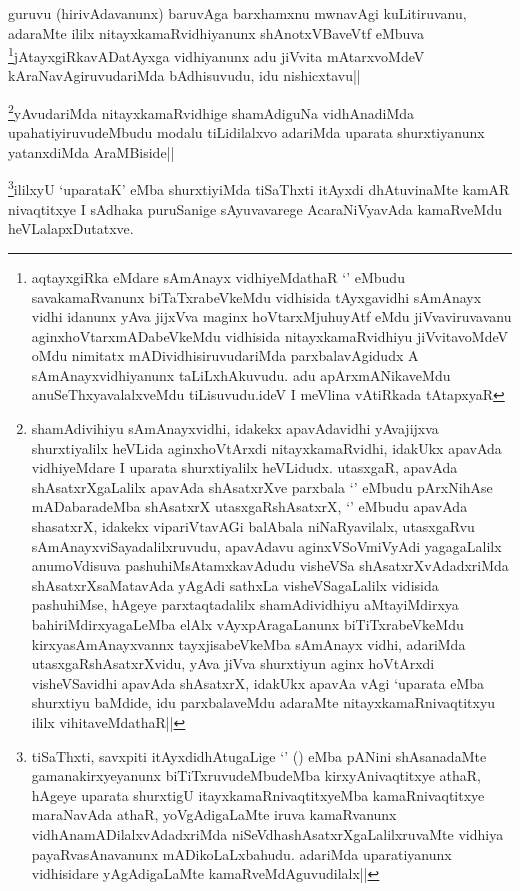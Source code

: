 
\begin{artha}
guruvu (hirivAdavanunx) baruvAga barxhamxnu mwnavAgi kuLitiruvanu, adaraMte ililx nitayxkamaRvidhiyanunx shAnotxVBaveVtf eMbuva \footnote{aqtayxgiRka eMdare sAmAnayx vidhiyeMdathaR `\stext' eMbudu savakamaRvanunx biTaTxrabeVkeMdu vidhisida tAyxgavidhi sAmAnayx vidhi idanunx yAva jijxVva maginx hoVtarxMjuhuyAtf eMdu jiVvaviruvavanu aginxhoVtarxmADabeVkeMdu vidhisida nitayxkamaRvidhiyu jiVvitavoMdeV oMdu nimitatx mADividhisiruvudariMda parxbalavAgidudx A sAmAnayxvidhiyanunx taLiLxhAkuvudu. adu apArxmANikaveMdu anuSeThxyavalalxveMdu tiLisuvudu.ideV I meVlina vAtiRkada tAtapxyaR}jAtayxgiRkavADatAyxga vidhiyanunx adu jiVvita mAtarxvoMdeV kAraNavAgiruvudariMda bAdhisuvudu, idu nishicxtavu||
\end{artha}

\begin{artha}
\footnote{shamAdivihiyu sAmAnayxvidhi, idakekx apavAdavidhi yAvajijxva shurxtiyalilx heVLida aginxhoVtArxdi nitayxkamaRvidhi, idakUkx apavAda vidhiyeMdare I uparata shurxtiyalilx heVLidudx. utasxgaR, apavAda shAsatxrXgaLalilx apavAda shAsatxrXve parxbala `\stext' eMbudu pArxNihAse mADabaradeMba shAsatxrX utasxgaRshAsatxrX, `\stext'  eMbudu apavAda shasatxrX, idakekx vipariVtavAGi balAbala niNaRyavilalx, utasxgaRvu sAmAnayxviSayadalilxruvudu, apavAdavu aginxVSoVmiVyAdi yagagaLalilx anumoVdisuva pashuhiMsAtamxkavAdudu visheVSa shAsatxrXvAdadxriMda shAsatxrXsaMatavAda yAgAdi sathxLa visheVSagaLalilx vidisida pashuhiMse, hAgeye parxtaqtadalilx shamAdividhiyu aMtayiMdirxya bahiriMdirxyagaLeMba elAlx vAyxpAragaLanunx biTiTxrabeVkeMdu kirxyasAmAnayxvannx tayxjisabeVkeMba sAmAnayx vidhi, adariMda utasxgaRshAsatxrXvidu, yAva jiVva shurxtiyun aginx hoVtArxdi visheVSavidhi apavAda shAsatxrX, idakUkx apavAa vAgi `uparata eMba shurxtiyu baMdide, idu parxbalaveMdu adaraMte nitayxkamaRnivaqtitxyu  ililx vihitaveMdathaR||}yAvudariMda nitayxkamaRvidhige shamAdiguNa vidhAnadiMda upahatiyiruvudeMbudu modalu tiLidilalxvo adariMda uparata shurxtiyanunx yatanxdiMda AraMBiside||
\end{artha}

\begin{artha}
\footnote{tiSaThxti, savxpiti itAyxdidhAtugaLige `\stext' (\stext) eMba pANini shAsanadaMte gamanakirxyeyanunx biTiTxruvudeMbudeMba kirxyAnivaqtitxye athaR, hAgeye uparata shurxtigU itayxkamaRnivaqtitxyeMba kamaRnivaqtitxye maraNavAda athaR, yoVgAdigaLaMte iruva kamaRvanunx vidhAnamADilalxvAdadxriMda niSeVdhashAsatxrXgaLalilxruvaMte vidhiya payaRvasAnavanunx mADikoLaLxbahudu. adariMda uparatiyanunx vidhisidare yAgAdigaLaMte kamaRveMdAguvudilalx||}ililxyU `uparataK' eMba shurxtiyiMda tiSaThxti itAyxdi dhAtuvinaMte kamAR nivaqtitxye I sAdhaka puruSanige sAyuvavarege AcaraNiVyavAda kamaRveMdu heVLalapxDutatxve.
\end{artha}

